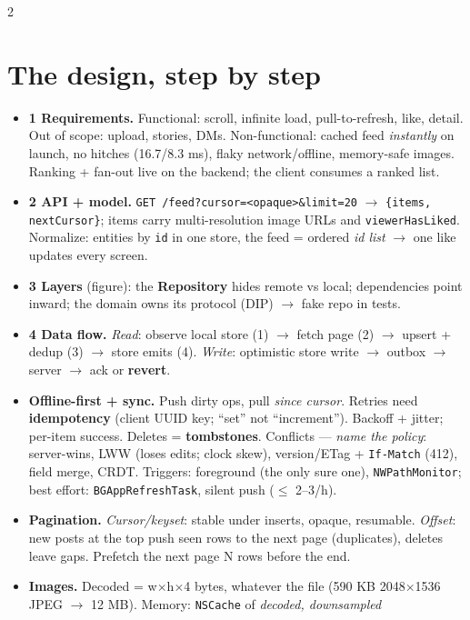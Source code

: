 \documentclass[8pt]{extarticle}
\begin{document}
\begin{multicols}{2}
\raggedright

\section{The design, step by step}
\begin{itemize}
  \item \textbf{1 Requirements.} Functional: scroll, infinite load,
        pull-to-refresh, like, detail. Out of scope: upload, stories, DMs. Non-functional:
        cached feed \emph{instantly} on launch, no hitches (16.7/8.3 ms), flaky
        network/offline, memory-safe images. Ranking + fan-out live on the backend; the
        client consumes a ranked list.
  \item \textbf{2 API + model.} \texttt{GET /feed?cursor=<opaque>\&limit=20}
        $\to$ \texttt{\{items, nextCursor\}}; items carry multi-resolution image URLs
        and \texttt{viewerHasLiked}. Normalize: entities by \texttt{id} in one store,
        the feed = ordered \emph{id list} $\to$ one like updates every screen.
  \item \textbf{3 Layers} (figure): the \textbf{Repository} hides remote vs local;
        dependencies point inward; the domain owns its protocol (DIP) $\to$ fake repo in tests.
  \item \textbf{4 Data flow.} \emph{Read}: observe local store (1) $\to$ fetch page
        (2) $\to$ upsert + dedup (3) $\to$ store emits (4). \emph{Write}: optimistic
        store write $\to$ outbox $\to$ server $\to$ ack or \textbf{revert}.
  \item \textbf{Offline-first + sync.} Push dirty ops, pull \emph{since cursor}.
        Retries need \textbf{idempotency} (client UUID key; ``set'' not ``increment'').
        Backoff + jitter; per-item success. Deletes = \textbf{tombstones}. Conflicts —
        \emph{name the policy}: server-wins, LWW (loses edits; clock skew), version/ETag
        + \texttt{If-Match} (412), field merge, CRDT. Triggers: foreground (the only sure one),
        \texttt{NWPathMonitor}; best effort: \texttt{BGAppRefreshTask}, silent push ($\le$ 2--3/h).
  \item \textbf{Pagination.} \emph{Cursor/keyset}: stable under inserts, opaque,
        resumable. \emph{Offset}: new posts at the top push seen rows to the next page (duplicates), deletes leave
        gaps. Prefetch the next page N rows before the end.
  \item \textbf{Images.} Decoded = w$\times$h$\times$4 bytes, whatever the file (590 KB 2048$\times$1536 JPEG $\to$ 12 MB). Memory: \texttt{NSCache} of \emph{decoded, downsampled}

\end{itemize}
\end{multicols}
\end{document}

